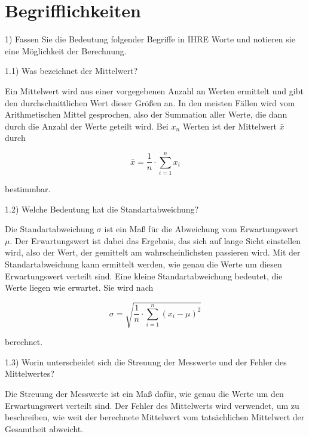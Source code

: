 \section{Begrifflichkeiten}
\label{sec:1}

1) Fassen Sie die Bedeutung folgender Begriffe in IHRE Worte und notieren sie eine Möglichkeit der Berechnung.

1.1) Was bezeichnet der Mittelwert?

Ein Mittelwert wird aus einer vorgegebenen Anzahl an Werten ermittelt und gibt den durchschnittlichen Wert dieser Größen an. In den meisten Fällen wird vom Arithmetischen Mittel gesprochen, also der Summation aller Werte, die dann durch die Anzahl der Werte geteilt wird. Bei $x_n$ Werten ist der Mittelwert $\bar{x}$ durch

\begin{equation}
    \bar{x} = \frac{1}{n} \cdot \sum_{i = 1}^{n} x_i
\end{equation}

bestimmbar.

1.2) Welche Bedeutung hat die Standartabweichung?

Die Standartabweichung $\sigma$ ist ein Maß für die Abweichung vom Erwartungswert $\mu$. 
Der Erwartungswert ist dabei das Ergebnis, das sich auf lange Sicht einstellen wird, also der Wert, der gemittelt am wahrscheinlichsten passieren wird.
Mit der Standartabweichung kann ermittelt werden, wie genau die Werte um diesen Erwartungswert verteilt sind.
Eine kleine Standartabweichung bedeutet, die Werte liegen wie erwartet.
Sie wird nach 

\begin{equation}
    \sigma = \sqrt{\frac{1}{n} \cdot \sum_{i = 1}^{n} \left(x_i - \mu \right)^2}
\end{equation}

berechnet.

1.3) Worin unterscheidet sich die Streuung der Messwerte und der Fehler des
Mittelwertes?

Die Streuung der Messwerte ist ein Maß dafür, wie genau die Werte um den Erwartungswert verteilt sind.
Der Fehler des Mittelwerts wird verwendet, um zu beschreiben, wie weit der berechnete Mittelwert vom tatsächlichen Mittelwert der Gesamtheit abweicht.

